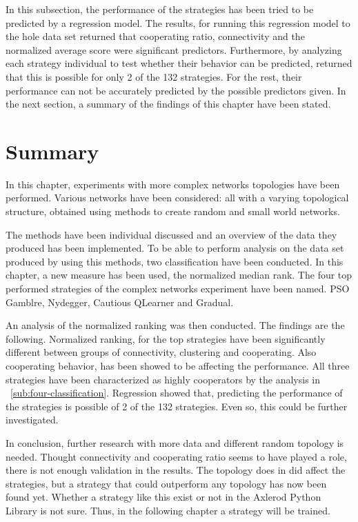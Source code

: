 In this subsection, the performance of the strategies has been tried to be predicted
by a regression model. The results, for running this regression model to the
hole data set returned that cooperating ratio, connectivity and the normalized
average score were significant predictors. Furthermore, by analyzing each strategy
individual to test whether their behavior can be predicted, returned that this
is possible for only 2 of the 132 strategies. For the rest, their performance can not
be accurately predicted by the possible predictors given. In the next section,
a summary of the findings of this chapter have been stated.

\section{Summary}
In this chapter, experiments with more complex networks topologies have been
performed. Various networks have been considered: all with a varying topological
structure, obtained using methods to create random and small world networks.

The methods have been individual discussed and an overview of the data they
produced has been implemented. To be able to perform analysis on the data set
produced by using this methods, two classification have been conducted.
In this chapter, a new measure has been used, the normalized median rank.
The four top performed strategies of the complex networks experiment have
been named. PSO Gamblre, Nydegger, Cautious QLearner and Gradual.

An analysis of the normalized ranking was then conducted. The findings are the
following. Normalized ranking, for the top strategies have been significantly different
between groups of connectivity, clustering and cooperating. Also cooperating behavior, has been showed to
be affecting the performance. All three strategies have been characterized as highly
cooperators by the analysis in ~\ref{sub:four-classification}. Regression showed that,
predicting the performance of the strategies is possible of 2 of the 132 strategies.
Even so, this could be further investigated.

In conclusion, further research with more data and different random topology
is needed. Thought connectivity and cooperating ratio seems to have played a role,
there is not enough validation in the results. The topology does in did affect
the strategies, but a strategy that could outperform any topology has now been
found yet. Whether a strategy like this exist or not in the Axlerod Python Library
is not sure. Thus, in the following chapter a strategy will be trained.
